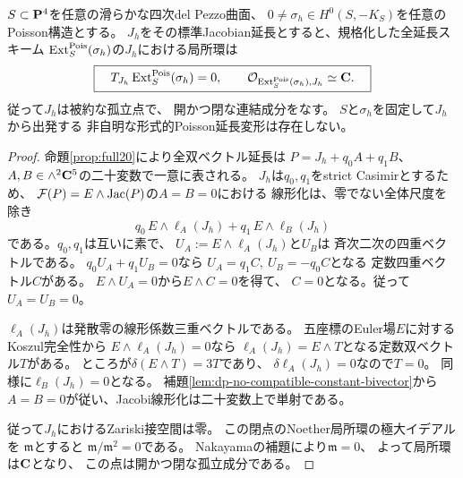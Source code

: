 \begin{theorem}[全Poisson切断に対する標準延長の被約孤立性]
\label{thm:dp-universal-jacobian-branch-rigidity}
$S\subset\mathbf P^4$を任意の滑らかな四次del Pezzo曲面、
$0\ne\sigma_h\in H^0(S,-K_S)$を任意のPoisson構造とする。
$J_h$をその標準Jacobian延長とすると、規格化した全延長スキーム
$\operatorname{Ext}^{\mathrm{Pois}}_S(\sigma_h)$の$J_h$における局所環は
\[
 \boxed{\quad
 T_{J_h}\operatorname{Ext}^{\mathrm{Pois}}_S(\sigma_h)=0,\qquad
 \mathcal O_{\operatorname{Ext}^{\mathrm{Pois}}_S(\sigma_h),J_h}\simeq\mathbf C.\quad}
\]
従って$J_h$は被約な孤立点で、
開かつ閉な連結成分をなす。
$S$と$\sigma_h$を固定して$J_h$から出発する
非自明な形式的Poisson延長変形は存在しない。
\end{theorem}
\begin{proof}
命題\ref{prop:full20}により全双ベクトル延長は
$P=J_h+q_0A+q_1B$、
$A,B\in\wedge^2\mathbf C^5$の二十変数で一意に表される。
$J_h$は$q_0,q_1$をstrict Casimirとするため、
$\mathcal F(P)=E\wedge\operatorname{Jac}(P)$の$A=B=0$における
線形化は、零でない全体尺度を除き
\[
 q_0\,E\wedge\ell_A(J_h)+q_1\,E\wedge\ell_B(J_h)
\]
である。$q_0,q_1$は互いに素で、
$U_A:=E\wedge\ell_A(J_h)$と$U_B$は
斉次二次の四重ベクトルである。
$q_0U_A+q_1U_B=0$なら
$U_A=q_1C,\ U_B=-q_0C$となる
定数四重ベクトル$C$がある。
$E\wedge U_A=0$から$E\wedge C=0$を得て、
$C=0$となる。従って$U_A=U_B=0$。

$\ell_A(J_h)$は発散零の線形係数三重ベクトルである。
五座標のEuler場$E$に対するKoszul完全性から
$E\wedge\ell_A(J_h)=0$なら
$\ell_A(J_h)=E\wedge T$となる定数双ベクトル$T$がある。
ところが$\delta(E\wedge T)=3T$であり、
$\delta\ell_A(J_h)=0$なので$T=0$。
同様に$\ell_B(J_h)=0$となる。
補題\ref{lem:dp-no-compatible-constant-bivector}から
$A=B=0$が従い、Jacobi線形化は二十変数上で単射である。

従って$J_h$におけるZariski接空間は零。
この閉点のNoether局所環の極大イデアルを
$\mathfrak m$とすると
$\mathfrak m/\mathfrak m^2=0$である。
Nakayamaの補題により$\mathfrak m=0$、
よって局所環は$\mathbf C$となり、
この点は開かつ閉な孤立成分である。
\end{proof}

